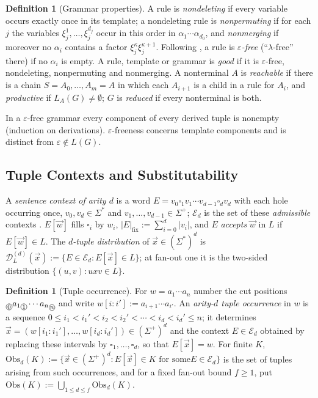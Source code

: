 \documentclass[11pt]{article}
\numberwithin{equation}{section}
\theoremstyle{plain}
\theoremstyle{definition}
\newtheorem{definition}[theorem]{Definition}
\theoremstyle{remark}
\newcommand{\D}{\mathcal{D}}
\newcommand{\tuple}[1]{\vec{#1}}
\newcommand{\blank}{\square}
\newcommand{\eps}{\varepsilon}
\newcommand{\cutpos}[1]{%
  \raisebox{-0.7ex}{%
    \tikz[baseline=(char.base)]{%
      \node[draw,circle,inner sep=0.4pt,font=\scriptsize]
        (char) {\ensuremath{#1}};%
    }%
  }%
}
\theoremstyle{plain}
\begin{document}
\begin{definition}[Grammar properties]
\label{def:grammar-properties}
A rule is \emph{nondeleting} if every variable occurs exactly once in its
template; a nondeleting rule is \emph{nonpermuting} if for each $j$ the
variables $\xi_j^1,\ldots,\xi_j^{d_j}$ occur in this order in
$\alpha_1\cdots\alpha_{d_0}$, and \emph{nonmerging} if moreover no $\alpha_i$
contains a factor $\xi_j^\kappa\xi_j^{\kappa+1}$.  Following
\cite[Section~2.3]{Yoshinaka2011}, a rule is \emph{$\eps$-free} (``$\lambda$-free''
there) if no $\alpha_i$ is empty.  A rule, template or grammar is \emph{good} if it is
$\eps$-free, nondeleting, nonpermuting and nonmerging.  A nonterminal $A$
is \emph{reachable} if there is a chain $S=A_0,\ldots,A_m=A$ in which each
$A_{i+1}$ is a child in a rule for $A_i$, and \emph{productive} if
$L_A(G)\ne\emptyset$; $G$ is \emph{reduced} if every nonterminal is both.
\end{definition}

In a $\eps$-free grammar every component of every derived tuple is nonempty
(induction on derivations).  $\eps$-freeness concerns template components
and is distinct from $\eps\notin L(G)$.

\subsection{Tuple Contexts and Substitutability}

A \emph{sentence context of arity $d$} is a word
$E=v_0\blank_1v_1\cdots v_{d-1}\blank_dv_d$ with each hole occurring once,
$v_0,v_d\in\Sigma^*$ and $v_1,\ldots,v_{d-1}\in\Sigma^+$; $\mathcal E_d$ is the
set of these \emph{admissible} contexts \cite[Section~3.1]{Yoshinaka2011}.
$E[\tuple w]$ fills $\blank_i$ by $w_i$, $|E|_{\mathrm{fix}}:=\sum_{i=0}^d|v_i|$,
and $E$ \emph{accepts} $\tuple w$ in $L$ if $E[\tuple w]\in L$.  The
\emph{$d$-tuple distribution} of $\tuple x\in(\Sigma^*)^d$ is
$\D_L^{(d)}(\tuple x):=\{E\in\mathcal E_d:E[\tuple x]\in L\}$; at fan-out one
it is the two-sided distribution $\{(u,v):uxv\in L\}$.

\begin{definition}[Tuple occurrence]
\label{def:tuple-occurrence}
For $w=a_1\cdots a_n$ number the cut positions
$\cutpos{0}a_1\cutpos{1}\cdots a_n\cutpos{n}$ and write
$w[i:i']:=a_{i+1}\cdots a_{i'}$.  An \emph{arity-$d$ tuple occurrence} in $w$
is a sequence $0\le i_1<i_1'<i_2<i_2'<\cdots<i_d<i_d'\le n$; it determines
$\tuple x=(w[i_1:i_1'],\ldots,w[i_d:i_d'])\in(\Sigma^+)^d$ and the context
$E\in\mathcal E_d$ obtained by replacing these intervals by
$\blank_1,\ldots,\blank_d$, so that $E[\tuple x]=w$.  For finite $K$,
$\mathrm{Obs}_d(K):=\{\tuple x\in(\Sigma^+)^d:E[\tuple x]\in K\text{ for some
}E\in\mathcal E_d\}$ is the set of tuples arising from such occurrences, and
for a fixed fan-out bound $f\ge1$, put
$\mathrm{Obs}(K):=\bigcup_{1\le d\le f}\mathrm{Obs}_d(K)$.
\end{definition}
\end{document}

